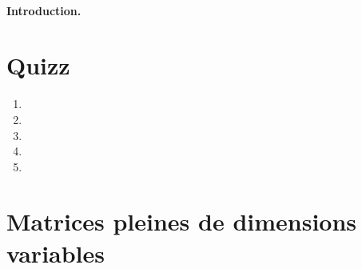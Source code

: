 \documentclass[ds]{sujet}
\begin{document}
\formation{} 
\matiere{}  
\auteur{} 
\def\SujetClsNumero{}
\paragraph{Introduction.}

\section{Quizz}
\begin{enumerate}
\item
\item
\item
\item
\item
\end{enumerate}
\section{Matrices pleines de dimensions variables} 


\end{document}
